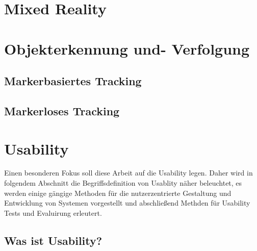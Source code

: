 
\section{Mixed Reality}



\section{Objekterkennung und- Verfolgung}



\subsection{Markerbasiertes Tracking}



\subsection{Markerloses Tracking}



\section{Usability}

Einen besonderen Fokus soll diese Arbeit auf die Usability legen. Daher wird in folgendem Abschnitt die Begriffsdefinition von Usablity näher beleuchtet, es werden einige 
gängige Methoden für die nutzerzentrierte Gestaltung und Entwicklung von Systemen vorgestellt und abschließend Methden für Usability Tests und Evaluirung erleutert. 

\subsection{Was ist Usability?}

